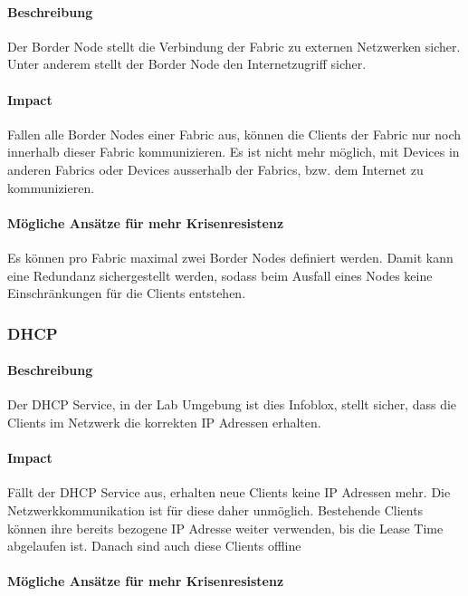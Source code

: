 \paragraph{Beschreibung}

Der Border Node stellt die Verbindung der Fabric zu externen Netzwerken sicher. Unter anderem stellt der Border Node den Internetzugriff sicher.

\paragraph{Impact}

Fallen alle Border Nodes einer Fabric aus, können die Clients der Fabric nur noch innerhalb dieser Fabric kommunizieren. Es ist nicht mehr möglich, mit Devices in anderen Fabrics oder Devices ausserhalb der Fabrics, bzw. dem Internet zu kommunizieren.

\paragraph{Mögliche Ansätze für mehr Krisenresistenz}

Es können pro Fabric maximal zwei Border Nodes definiert werden. Damit kann eine Redundanz sichergestellt werden, sodass beim Ausfall eines Nodes keine Einschränkungen für die Clients entstehen. 

\subsubsection{DHCP}

\paragraph{Beschreibung}

Der DHCP Service, in der Lab Umgebung ist dies Infoblox, stellt sicher, dass die Clients im Netzwerk die korrekten IP Adressen erhalten.

\paragraph{Impact}

Fällt der DHCP Service aus, erhalten neue Clients keine IP Adressen mehr. Die Netzwerkkommunikation ist für diese daher unmöglich. Bestehende Clients können ihre bereits bezogene IP Adresse weiter verwenden, bis die Lease Time abgelaufen ist. Danach sind auch diese Clients offline

\paragraph{Mögliche Ansätze für mehr Krisenresistenz}

